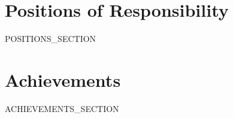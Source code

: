 \documentclass[a4paper,11pt]{article}
\begin{document}
\section{Positions of Responsibility}
\begin{itemize}[leftmargin=*]
{{POSITIONS_SECTION}}
\end{itemize}

\section{Achievements}
\begin{itemize}[leftmargin=*]
{{ACHIEVEMENTS_SECTION}}
\end{itemize}
\end{document}
